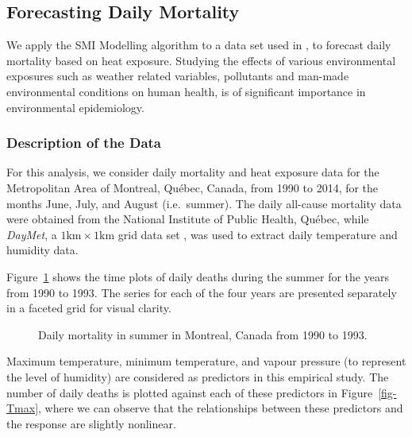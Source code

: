 \documentclass[
  11pt,
  a4paper,
]{article}
\begin{document}
\subsection{Forecasting Daily Mortality}\label{sec-mortality}

We apply the SMI Modelling algorithm to a data set used in
\textcite{Masselot2022}, to forecast daily mortality based on heat
exposure. Studying the effects of various environmental exposures such
as weather related variables, pollutants and man-made environmental
conditions on human health, is of significant importance in
environmental epidemiology.

\subsubsection{Description of the Data}\label{description-of-the-data}

For this analysis, we consider daily mortality and heat exposure data
for the Metropolitan Area of Montreal, Québec, Canada, from 1990 to
2014, for the months June, July, and August (i.e.~summer). The daily
all-cause mortality data were obtained from the National Institute of
Public Health, Québec, while \emph{DayMet}, a
\(1\text{km} \times 1\text{km}\) grid data set \autocite{Thornton2021},
was used to extract daily temperature and humidity data.

Figure~\ref{fig-deaths} shows the time plots of daily deaths during the
summer for the years from 1990 to 1993. The series for each of the four
years are presented separately in a faceted grid for visual clarity.

\begin{figure}


\caption{\label{fig-deaths}Daily mortality in summer in Montreal, Canada
from 1990 to 1993.}

\end{figure}%

Maximum temperature, minimum temperature, and vapour pressure (to
represent the level of humidity) are considered as predictors in this
empirical study. The number of daily deaths is plotted against each of
these predictors in Figure~\ref{fig-Tmax}, where we can observe that the
relationships between these predictors and the response are slightly
nonlinear.
\end{document}
